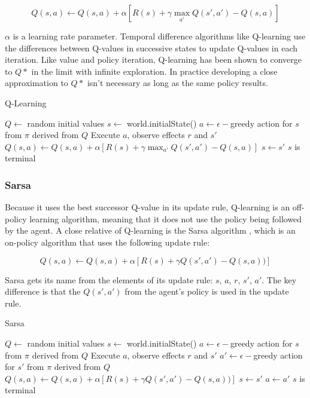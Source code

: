 \begin{equation}\label{eqn:q-update}
Q(s, a) \leftarrow Q(s, a) + \alpha [R(s) + \gamma \max_{a'} Q(s', a') - Q(s, a)]
\end{equation}

$\alpha$ is a learning rate parameter. Temporal difference algorithms like Q-learning use the differences between Q-values in successive states to update Q-values in each iteration. Like value and policy iteration, Q-learning has been shown to converge to $Q*$ in the limit with infinite exploration. In practice developing a close approximation to $Q*$ isn't necessary as long as the same policy results.

\begin{algorithm}
  \caption{Q-Learning}\label{alg:q-learning}
  \begin{algorithmic}
    \State $Q \gets$ random initial values
      \State $s \gets$ world.initialState()
      \Repeat
        \State $a \gets \epsilon-$greedy action for $s$ from $\pi$ derived from $Q$
        \State Execute $a$, observe effects $r$ and $s'$
        \State $Q(s, a) \gets Q(s, a) + \alpha [R(s) + \gamma \max_{a'} Q(s', a') - Q(s, a)]$
        \State $s \gets s'$
      \Until $s$ is terminal
    \EndFor
  \end{algorithmic}
\end{algorithm}


\subsubsection{Sarsa}

Because it uses the best successor Q-value in its update rule, Q-learning is an off-policy learning algorithm, meaning that it does not use the policy being followed by the agent. A close relative of Q-learning is the Sarsa algorithm \cite{rummery1994online}, which is an on-policy algorithm that uses the following update rule:

\begin{equation}\label{eqn:sarsa-update}
Q(s, a) \leftarrow Q(s, a) + \alpha [R(s) + \gamma Q(s', a') - Q(s, a))]
\end{equation}

Sarsa gets its name from the elements of its update rule: $s$, $a$, $r$, $s'$, $a'$. The key difference is that the $Q(s', a')$ from the agent's policy is used in the update rule.

\begin{algorithm}
  \caption{Sarsa}\label{alg:sarsa}
  \begin{algorithmic}
    \State $Q \gets$ random initial values
      \State $s \gets$ world.initialState()
      \State $a \gets \epsilon-$greedy action for $s$ from $\pi$ derived from $Q$
      \Repeat
        \State Execute $a$, observe effects $r$ and $s'$
        \State $a' \gets \epsilon-$greedy action for $s'$ from $\pi$ derived from $Q$
        \State $Q(s, a) \gets Q(s, a) + \alpha [R(s) + \gamma Q(s', a') - Q(s, a))]$
        \State $s \gets s'$
        \State $a \gets a'$
      \Until $s$ is terminal
    \EndFor
  \end{algorithmic}
\end{algorithm}

